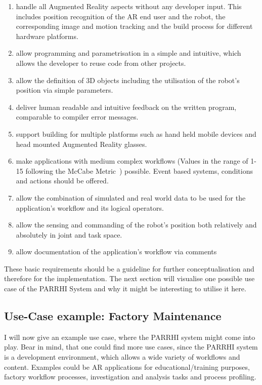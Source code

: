 \begin{enumerate}
	\setlength\itemsep{-1em}
	\item handle all Augmented Reality aspects without any developer input. This includes position recognition of the AR end user and the robot, the corresponding image and motion tracking and the build process for different hardware platforms.
	\item allow programming and parametrisation in a simple and intuitive, which allows the developer to reuse code from other projects.
	\item allow the definition of 3D objects including the utilisation of the robot's position via simple parameters.
	\item deliver human readable and intuitive feedback on the written program, comparable to compiler error messages.
	\item support building for multiple platforms such as hand held mobile devices and head mounted Augmented Reality glasses.
	\item make applications with medium complex workflows (Values in the range of 1-15 following the McCabe Metric~\cite{mccabe1976complexity}) possible. Event based systems, conditions and actions should be offered.
	\item allow the combination of simulated and real world data to be used for the application's workflow and its logical operators.
	\item allow the sensing and commanding of the robot's position both relatively and absolutely in joint and task space.
	\item allow documentation of the application's workflow via comments
\end{enumerate}

These basic requirements should be a guideline for further conceptualisation and therefore for the implementation. The next section will visualise one possible use case of the PARRHI System and why it might be interesting to utilise it here.

\subsection{Use-Case example: Factory Maintenance} \label{Section:UseCaseDefinition}

I will now give an example use case, where the PARRHI system might come into play. Bear in mind, that one could find more use cases, since the PARRHI system is a development environment, which allows a wide variety of workflows and content. Examples could be AR applications for educational/training purposes, factory workflow processes, investigation and analysis tasks and process profiling.


